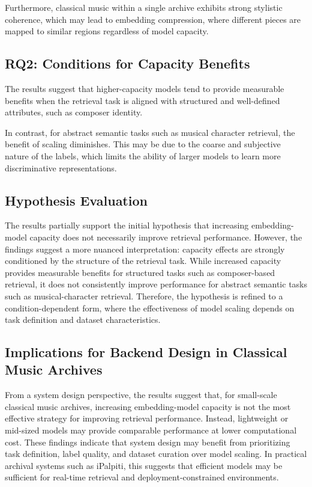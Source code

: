 \documentclass{article}
\begin{document}
Furthermore, classical music within a single archive exhibits strong stylistic coherence,
which may lead to embedding compression, where different pieces are mapped to similar regions
regardless of model capacity.

\subsection{RQ2: Conditions for Capacity Benefits}
The results suggest that higher-capacity models tend to provide measurable benefits when the retrieval task is aligned with structured and well-defined attributes, such as composer identity.

In contrast, for abstract semantic tasks such as musical character retrieval,
the benefit of scaling diminishes.
This may be due to the coarse and subjective nature of the labels,
which limits the ability of larger models to learn more discriminative representations.

\subsection{Hypothesis Evaluation}
The results partially support the initial hypothesis that increasing embedding-model capacity does not necessarily improve retrieval performance.
However, the findings suggest a more nuanced interpretation: 
capacity effects are strongly conditioned by the structure of the retrieval task.
While increased capacity provides measurable benefits for structured tasks such as composer-based retrieval, 
it does not consistently improve performance for abstract semantic tasks such as musical-character retrieval.
Therefore, the hypothesis is refined to a condition-dependent form, 
where the effectiveness of model scaling depends on task definition and dataset characteristics.

\subsection{Implications for Backend Design in Classical Music Archives} From a system design perspective, the results suggest that, for small-scale classical music archives, increasing embedding-model capacity is not the most effective strategy for improving retrieval performance. 
Instead, lightweight or mid-sized models may provide comparable performance at lower computational cost.
These findings indicate that system design may benefit from prioritizing task definition, label quality, and dataset curation over model scaling. In practical archival systems such as iPalpiti, this suggests that efficient models may be sufficient for real-time retrieval and deployment-constrained environments.
\end{document}
